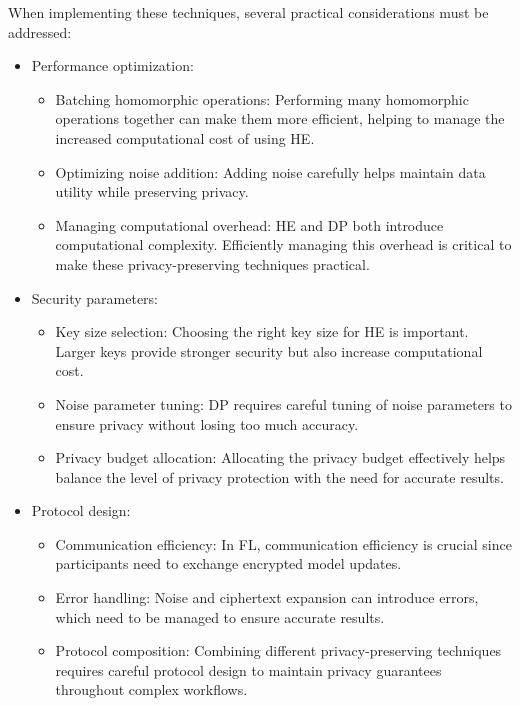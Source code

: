 \documentclass[
  letterpaper,
  DIV=11,
  numbers=noendperiod,
  oneside]{scrartcl}
\begin{document}
When implementing these techniques, several practical considerations
must be addressed:

\begin{itemize}
\item
  Performance optimization:

  \begin{itemize}
  \item
    Batching homomorphic operations: Performing many homomorphic
    operations together can make them more efficient, helping to manage
    the increased computational cost of using HE.
  \item
    Optimizing noise addition: Adding noise carefully helps maintain
    data utility while preserving privacy.
  \item
    Managing computational overhead: HE and DP both introduce
    computational complexity. Efficiently managing this overhead is
    critical to make these privacy-preserving techniques practical.
  \end{itemize}
\item
  Security parameters:

  \begin{itemize}
  \item
    Key size selection: Choosing the right key size for HE is important.
    Larger keys provide stronger security but also increase
    computational cost.
  \item
    Noise parameter tuning: DP requires careful tuning of noise
    parameters to ensure privacy without losing too much accuracy.
  \item
    Privacy budget allocation: Allocating the privacy budget effectively
    helps balance the level of privacy protection with the need for
    accurate results.
  \end{itemize}
\item
  Protocol design:

  \begin{itemize}
  \item
    Communication efficiency: In FL, communication efficiency is crucial
    since participants need to exchange encrypted model updates.
  \item
    Error handling: Noise and ciphertext expansion can introduce errors,
    which need to be managed to ensure accurate results.
  \item
    Protocol composition: Combining different privacy-preserving
    techniques requires careful protocol design to maintain privacy
    guarantees throughout complex workflows.
  \end{itemize}
\end{itemize}
\end{document}
